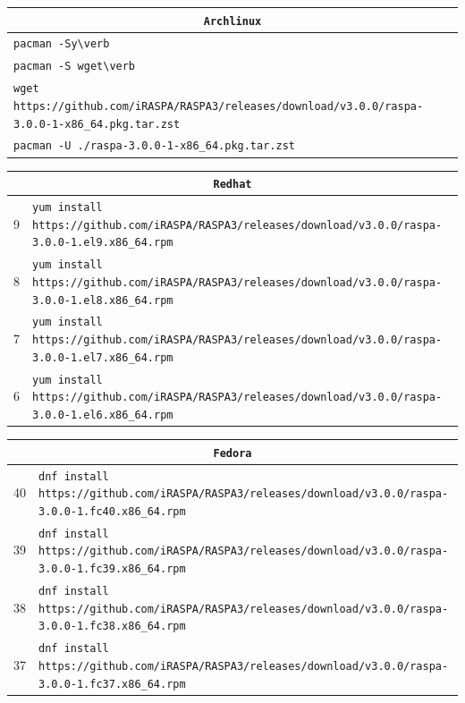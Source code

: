 \begin{table}[p]
  \scriptsize
  \begin{tabularx}{\linewidth}{X}
    \multicolumn{1}{c}{\texttt{Archlinux}}\\
    \hline
      \verb+pacman -Sy\verb+\\
      \verb+pacman -S wget\verb+\\
      \verb+wget https://github.com/iRASPA/RASPA3/releases/download/v3.0.0/raspa-3.0.0-1-x86_64.pkg.tar.zst+ \\
      \verb+pacman -U ./raspa-3.0.0-1-x86_64.pkg.tar.zst+\\
  \end{tabularx}
  \newline
\vspace*{0.5 cm}
\newline
  \begin{tabularx}{\linewidth}{c|X}
    \multicolumn{2}{c}{\texttt{Redhat}}\\
   \hline
  9 & \verb+yum install https://github.com/iRASPA/RASPA3/releases/download/v3.0.0/raspa-3.0.0-1.el9.x86_64.rpm+\\
     \hline
  8 & \verb+yum install https://github.com/iRASPA/RASPA3/releases/download/v3.0.0/raspa-3.0.0-1.el8.x86_64.rpm+\\
     \hline
  7 & \verb+yum install https://github.com/iRASPA/RASPA3/releases/download/v3.0.0/raspa-3.0.0-1.el7.x86_64.rpm+\\
     \hline
  6 & \verb+yum install https://github.com/iRASPA/RASPA3/releases/download/v3.0.0/raspa-3.0.0-1.el6.x86_64.rpm+\\
  \end{tabularx}
  \newline
\vspace*{0.5 cm}
\newline
  \begin{tabularx}{\linewidth}{c|X}
    \multicolumn{2}{c}{\texttt{Fedora}}\\
   \hline
  40 & \verb+dnf install https://github.com/iRASPA/RASPA3/releases/download/v3.0.0/raspa-3.0.0-1.fc40.x86_64.rpm+\\
     \hline
  39 & \verb+dnf install https://github.com/iRASPA/RASPA3/releases/download/v3.0.0/raspa-3.0.0-1.fc39.x86_64.rpm+\\
     \hline
  38 & \verb+dnf install https://github.com/iRASPA/RASPA3/releases/download/v3.0.0/raspa-3.0.0-1.fc38.x86_64.rpm+\\
     \hline
  37 & \verb+dnf install https://github.com/iRASPA/RASPA3/releases/download/v3.0.0/raspa-3.0.0-1.fc37.x86_64.rpm+\\

\end{tabularx}
\end{table}
